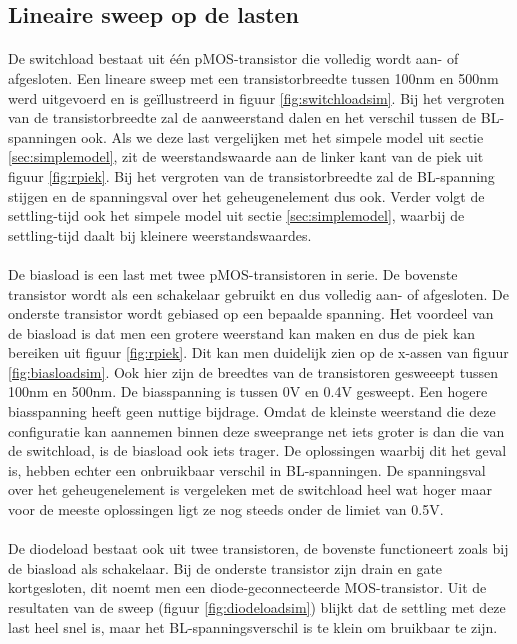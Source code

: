 \subsection{Lineaire sweep op de lasten}\label{sec:linload}
\paragraph{}
De switchload bestaat uit \'{e}\'{e}n pMOS-transistor die volledig wordt aan- of afgesloten. Een lineare sweep met een transistorbreedte tussen 100nm en 500nm werd uitgevoerd en is geïllustreerd in figuur \ref{fig:switchloadsim}. Bij het vergroten van de transistorbreedte zal de aanweerstand dalen en het verschil tussen de BL-spanningen ook. Als we deze last vergelijken met het simpele model uit sectie \ref{sec:simplemodel}, zit de weerstandswaarde aan de linker kant van de piek uit figuur \ref{fig:rpiek}. Bij het vergroten van de transistorbreedte zal de BL-spanning stijgen en de spanningsval over het geheugenelement dus ook. Verder volgt de settling-tijd ook het simpele model uit sectie \ref{sec:simplemodel}, waarbij de settling-tijd daalt bij kleinere weerstandswaardes.

\paragraph{}
De biasload is een last met twee pMOS-transistoren in serie. De bovenste transistor wordt als een schakelaar gebruikt en dus volledig aan- of afgesloten. De onderste transistor wordt gebiased op een bepaalde spanning. Het voordeel van de biasload is dat men een grotere weerstand kan maken en dus de piek kan bereiken uit figuur \ref{fig:rpiek}. Dit kan men duidelijk zien op de x-assen van figuur \ref{fig:biasloadsim}. Ook hier zijn de breedtes van de transistoren gesweeept tussen 100nm en 500nm. De biasspanning is tussen 0V en 0.4V gesweept. Een hogere biasspanning heeft geen nuttige bijdrage. Omdat de kleinste weerstand die deze configuratie kan aannemen binnen deze sweeprange net iets groter is dan die van de switchload, is de biasload ook iets trager. De oplossingen waarbij dit het geval is, hebben echter een onbruikbaar verschil in BL-spanningen. De spanningsval over het geheugenelement is vergeleken met de switchload heel wat hoger maar voor de meeste oplossingen ligt ze nog steeds onder de limiet van 0.5V.

\paragraph{}
De diodeload bestaat ook uit twee transistoren, de bovenste functioneert zoals bij de biasload als schakelaar. Bij de onderste transistor zijn drain en gate kortgesloten, dit noemt men een diode-geconnecteerde MOS-transistor. Uit de resultaten van de sweep (figuur \ref{fig:diodeloadsim}) blijkt dat de settling met deze last heel snel is, maar het BL-spanningsverschil is te klein om bruikbaar te zijn.

